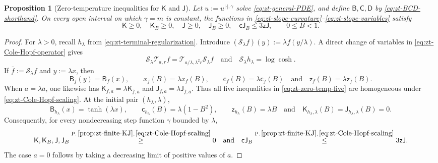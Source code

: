 \documentclass[10pt]{amsart}
\newtheorem{proposition}[proposition]{Proposition}
\theoremstyle{definition}
\theoremstyle{remark}
\numberwithin{equation}{section}
\newcommand{\1}{\mathbf 1}
\newcommand{\stackref}[2]{\stackrel{#2}{#1}}
\begin{document}
\begin{proposition}[Zero-temperature inequalities for $\mathsf K$ and $\mathsf J$]
\label{prop:zt-zero-temp-KJ}
Let $u:=u^{|\cdot|,\gamma}$ solve \eqref{eq:zt-general-PDE}, and define $\mathsf B,\mathsf C,\mathsf D$ by \eqref{eq:zt-BCD-shorthand}. On every open interval on which $\gamma=m$ is constant, the functions in \eqref{eq:zt-slope-curvature}--\eqref{eq:zt-slope-variables} satisfy
\begin{equation}
 \mathsf K\geq0,\quad \mathsf K_B\geq0,\quad \mathsf J\geq0,\quad \mathsf J_B\geq0,\quad
 \mathsf c\mathsf J_B\leq3\mathsf z\mathsf J,\qquad 0\leq B<1.
 \label{eq:zt-zero-temp-five}
\end{equation}
\end{proposition}

\begin{proof}
For $\lambda>0$, recall $h_\lambda$ from \eqref{eq:zt-terminal-regularization}.
Introduce $(\mathcal S_\lambda f)(y):=\lambda f(y/\lambda)$.  A direct change of variables in \eqref{eq:zt-Cole-Hopf-operator} gives
\begin{equation}
 \mathcal S_\lambda\mathcal T_{a,r}f
 =\mathcal T_{a/\lambda,\lambda^2r}\mathcal S_\lambda f
 \quad\text{and}\quad \mathcal S_\lambda h_\lambda=\log\cosh.
 \label{eq:zt-Cole-Hopf-scaling}
\end{equation}
If $\bar f:=\mathcal S_\lambda f$ and $y:=\lambda x$, then
\begin{equation*}
 \mathsf B_{\bar f}(y)=\mathsf B_f(x),\qquad x_{\bar f}(B)=\lambda x_f(B),\qquad
 \mathsf c_f(B)=\lambda\mathsf c_{\bar f}(B)
 \quad\text{and}\quad \mathsf z_f(B)=\lambda\mathsf z_{\bar f}(B).
\end{equation*}
When $a=\lambda\bar a$, one likewise has $\mathsf K_{f,a}=\lambda\mathsf K_{\bar f,\bar a}$ and $\mathsf J_{f,a}=\lambda\mathsf J_{\bar f,\bar a}$. Thus all five inequalities in \eqref{eq:zt-zero-temp-five} are homogeneous under \eqref{eq:zt-Cole-Hopf-scaling}. At the initial pair $(h_\lambda,\lambda)$,
\begin{equation*}
 \mathsf B_{h_\lambda}(x)=\tanh(\lambda x),\qquad \mathsf c_{h_\lambda}(B)=\lambda(1-B^2),\qquad \mathsf z_{h_\lambda}(B)=\lambda B
 \quad\text{and}\quad \mathsf K_{h_\lambda,\lambda}(B)=\mathsf J_{h_\lambda,\lambda}(B)=0.
\end{equation*}
Consequently, for every nondecreasing step function $\gamma$ bounded by $\lambda$,
\begin{equation*}
 \mathsf K,\mathsf K_B,\mathsf J,\mathsf J_B
 \stackref{\geq}{\mathrm{P.\,\ref{prop:zt-finite-KJ}},\,\eqref{eq:zt-Cole-Hopf-scaling}}0
 \quad\text{and}\quad
 \mathsf c\mathsf J_B
 \stackref{\leq}{\mathrm{P.\,\ref{prop:zt-finite-KJ}},\,\eqref{eq:zt-Cole-Hopf-scaling}}
 3\mathsf z\mathsf J.
\end{equation*}
The case $a=0$ follows by taking a decreasing limit of positive values of $a$.


\end{proof}
\end{document}
